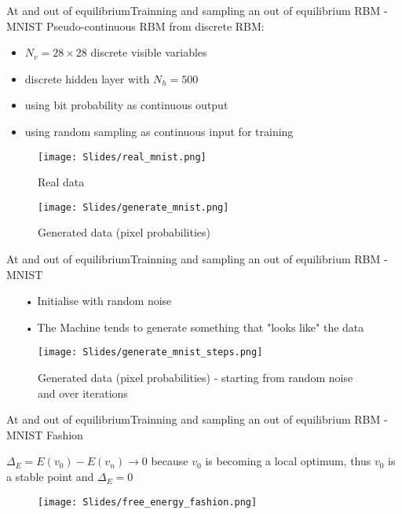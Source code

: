 \documentclass{beamer}
\begin{document}
\begin{frame}{At and out of equilibrium}{Trainning and sampling an out of equilibrium RBM - MNIST}
Pseudo-continuous RBM from discrete RBM:
\begin{itemize}
    \item $N_v = 28\times28$ discrete visible variables
    \item discrete hidden layer with $N_h = 500$
    \item using bit probability as continuous output 
    \item using random sampling as continuous input for training
\end{itemize}
    
\begin{figure}
\centering
\begin{minipage}{.5\textwidth}
  \centering
  \texttt{[image: Slides/real\_mnist.png]}
  \caption{Real data\vspace*{1em}}
  \label{fig:test1}
\end{minipage}%
\begin{minipage}{.5\textwidth}
  \texttt{[image: Slides/generate\_mnist.png]}
  \caption{Generated data (pixel probabilities)}
  \label{fig:test2}
\end{minipage}
\end{figure}

\end{frame}


\begin{frame}{At and out of equilibrium}{Trainning and sampling an out of equilibrium RBM - MNIST}

\vspace*{-0.5em}

\begin{itemize}
    \item[•] Initialise with random noise
    \item[•] The Machine tends to generate something that "looks like" the data
\end{itemize}
\begin{figure}
  \texttt{[image: Slides/generate\_mnist\_steps.png]}
  \caption{Generated data (pixel probabilities) - starting from random noise and over iterations}
  \label{fig:test2}
\end{figure}

\end{frame}


\begin{frame}{At and out of equilibrium}{Trainning and sampling an out of equilibrium RBM - MNIST Fashion}

$\Delta_E = E(v_0) - E(v_n) \rightarrow 0$ because $v_0$ is becoming a local optimum, thus $v_0$ is a stable point and $\Delta_E = 0$

\begin{figure}
  \texttt{[image: Slides/free\_energy\_fashion.png]}
  \label{fig:test2}
\end{figure}

\end{frame}
\end{document}
